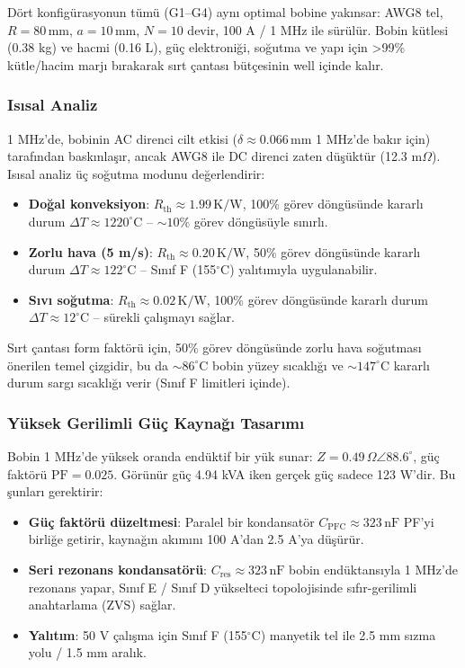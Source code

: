 Dört konfigürasyonun tümü (G1--G4) aynı optimal bobine yakınsar: AWG8 tel, $R=80\,\text{mm}$, $a=10\,\text{mm}$, $N=10$ devir, 100 A / 1 MHz ile sürülür. Bobin kütlesi (0.38 kg) ve hacmi (0.16 L), güç elektroniği, soğutma ve yapı için >99\% kütle/hacim marjı bırakarak sırt çantası bütçesinin well içinde kalır.

\subsubsection{Isısal Analiz}

1 MHz'de, bobinin AC direnci cilt etkisi ($\delta \approx 0.066\,\text{mm}$ 1 MHz'de bakır için) tarafından baskınlaşır, ancak AWG8 ile DC direnci zaten düşüktür (12.3 m$\Omega$). Isısal analiz üç soğutma modunu değerlendirir:

\begin{itemize}
    \item \textbf{Doğal konveksiyon}: $R_{\text{th}} \approx 1.99\,\text{K/W}$, 100\% görev döngüsünde kararlı durum $\Delta T \approx 1220^\circ\text{C}$ -- $\sim 10\%$ görev döngüsüyle sınırlı.
    \item \textbf{Zorlu hava (5 m/s)}: $R_{\text{th}} \approx 0.20\,\text{K/W}$, 50\% görev döngüsünde kararlı durum $\Delta T \approx 122^\circ\text{C}$ -- Sınıf F (155$^\circ$C) yalıtımıyla uygulanabilir.
    \item \textbf{Sıvı soğutma}: $R_{\text{th}} \approx 0.02\,\text{K/W}$, 100\% görev döngüsünde kararlı durum $\Delta T \approx 12^\circ\text{C}$ -- sürekli çalışmayı sağlar.
\end{itemize}

Sırt çantası form faktörü için, 50\% görev döngüsünde zorlu hava soğutması önerilen temel çizgidir, bu da $\sim 86^\circ\text{C}$ bobin yüzey sıcaklığı ve $\sim 147^\circ\text{C}$ kararlı durum sargı sıcaklığı verir (Sınıf F limitleri içinde).

\subsubsection{Yüksek Gerilimli Güç Kaynağı Tasarımı}

Bobin 1 MHz'de yüksek oranda endüktif bir yük sunar: $Z = 0.49\,\Omega \angle 88.6^\circ$, güç faktörü $\text{PF} = 0.025$. Görünür güç 4.94 kVA iken gerçek güç sadece 123 W'dir. Bu şunları gerektirir:

\begin{itemize}
    \item \textbf{Güç faktörü düzeltmesi}: Paralel bir kondansatör $C_{\text{PFC}} \approx 323\,\text{nF}$ PF'yi birliğe getirir, kaynağın akımını 100 A'dan 2.5 A'ya düşürür.
    \item \textbf{Seri rezonans kondansatörü}: $C_{\text{res}} \approx 323\,\text{nF}$ bobin endüktansıyla 1 MHz'de rezonans yapar, Sınıf E / Sınıf D yükselteci topolojisinde sıfır-gerilimli anahtarlama (ZVS) sağlar.
    \item \textbf{Yalıtım}: 50 V çalışma için Sınıf F (155$^\circ$C) manyetik tel ile 2.5 mm sızma yolu / 1.5 mm aralık.
\end{itemize}

